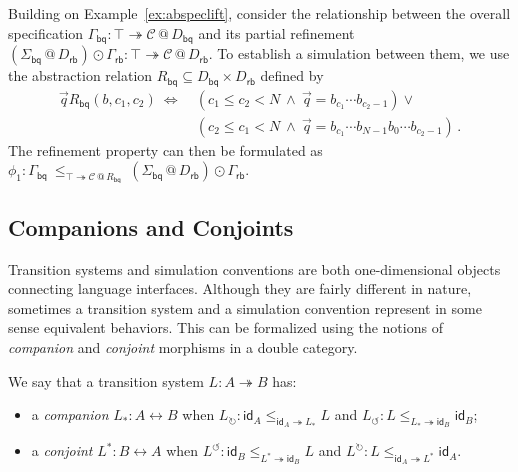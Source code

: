 \documentclass[acmsmall,screen,review,anonymous]{acmart}
\newcommand{\kw}[1]{\ensuremath{ \mathsf{#1} }}
\begin{document}
\begin{example} \label{ex:bqcorrect} %
Building on Example~\ref{ex:abspeclift},
consider the relationship between
the overall specification $
  \Gamma_\kw{bq} :
    \top \twoheadrightarrow \mathcal{C} \mathbin@ D_\kw{bq}
$
and its partial refinement
$
  (\Sigma_\kw{bq} \mathbin@ D_\kw{rb}) \odot \Gamma_\kw{rb} :
    \top \twoheadrightarrow \mathcal{C} \mathbin@ D_\kw{rb}
$.
To establish a simulation between them,
we use the abstraction relation
$R_\kw{bq} \subseteq D_\kw{bq} \times D_\kw{rb}$
defined by
\begin{align*}
  \vec{q} \mathrel{R_\kw{bq}} (b, c_1, c_2) \:\Leftrightarrow\: {}
    & (c_1 \le c_2 < N \:\wedge\: \vec{q} = b_{c_1} \cdots b_{c_2-1}) \vee {} \\
    & (c_2 \le c_1 < N \:\wedge\: \vec{q} = b_{c_1} \cdots b_{N-1} b_0 \cdots b_{c_2 - 1})
  \,.
\end{align*}
The refinement property can then be formulated as
$
  \phi_1 :
  \Gamma_\kw{bq}
  \:\le_{\top \twoheadrightarrow \mathcal{C} \mathbin@ R_\kw{bq}}\:
  (\Sigma_\kw{bq} \mathbin@ D_\kw{rb}) \odot
  \Gamma_\kw{rb}
$.
\end{example}

\subsection{Companions and Conjoints} %

Transition systems and simulation conventions
are both one-dimensional objects
connecting language interfaces.
Although
they are fairly different in nature,
sometimes
a transition system and a simulation convention
represent in some sense equivalent behaviors.
This
can be formalized using the notions of
\emph{companion} and \emph{conjoint}
morphisms in a double category.

\begin{definition} %
We say that a transition system $L : A \twoheadrightarrow B$ has:
\begin{itemize}
  \item a \emph{companion} $L_* : A \leftrightarrow B$ when
    $L_\circlearrowright : \kw{id}_A \le_{\kw{id}_A \twoheadrightarrow L_*} L$
    and
    $L_\circlearrowleft : L \le_{L_* \twoheadrightarrow \kw{id}_B} \kw{id}_B$;
  \item a \emph{conjoint} $L^* : B \leftrightarrow A$ when
    $L^\circlearrowleft : \kw{id}_B \le_{L^* \twoheadrightarrow \kw{id}_B} L$
    and
    $L^\circlearrowright : L \le_{\kw{id}_A \twoheadrightarrow L^*} \kw{id}_A$.
\end{itemize}
\end{definition}
\end{document}
